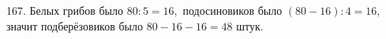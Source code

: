 167. Белых грибов было $80:5=16,$ подосиновиков было $(80-16):4=16,$ значит подберёзовиков было $80-16-16=48$ штук.\\

